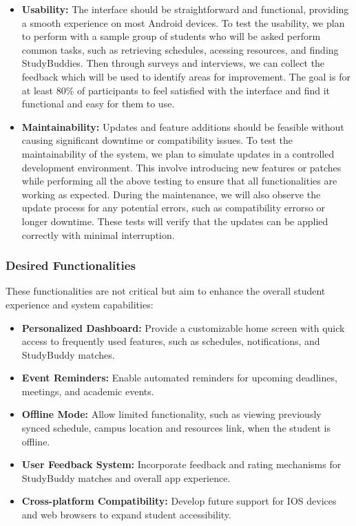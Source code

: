 \documentclass[12pt]{article}
\begin{document}
\begin{itemize}
    \item \textbf{Usability:} The interface should be straightforward and functional, providing a smooth experience on most Android devices. 
    To test the usability, we plan to perform with a sample group of students who will be asked perform common tasks, such as retrieving schedules, acessing resources, and finding StudyBuddies. 
    Then through surveys and interviews, we can collect the feedback which will be used to identify areas for improvement. 
    The goal is for at least 80\% of participants to feel satisfied with the interface and find it functional and easy for them to use.

    \item \textbf{Maintainability:} Updates and feature additions should be feasible without causing significant downtime or compatibility issues. 
    To test the maintainability of the system, we plan to simulate updates in a controlled development environment. This involve introducing new features or patches while performing all the above testing to ensure that all functionalities are working as expected.
    During the maintenance, we will also observe the update process for any potential errors, such as compatibility errorso or longer downtime. 
    These tests will verify that the updates can be applied correctly with minimal interruption.
\end{itemize}

\subsubsection{Desired Functionalities}
These functionalities are not critical but aim to enhance the overall student experience and system capabilities:  
\begin{itemize}  
    \item \textbf{Personalized Dashboard:} Provide a customizable home screen with quick access to frequently used features, such as schedules, notifications, and StudyBuddy matches.  
    \item \textbf{Event Reminders:} Enable automated reminders for upcoming deadlines, meetings, and academic events.  
    \item \textbf{Offline Mode:} Allow limited functionality, such as viewing previously synced schedule, campus location and resources link, when the student is offline.  
    \item \textbf{User Feedback System:} Incorporate feedback and rating mechanisms for StudyBuddy matches and overall app experience.  
    \item \textbf{Cross-platform Compatibility:} Develop future support for IOS devices and web browsers to expand student accessibility.  
\end{itemize}  
\end{document}
